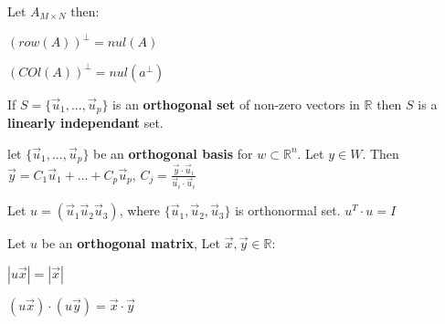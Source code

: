 \documentclass[5pt]{article}
\begin{document}
\begin{multicols}{2}
\begin{theorem}
  Let $A_{M\times N}$ then:
  \begin{itemize*}
    \item $(row(A))^\perp=nul(A)$
    \item $(COl(A))^\perp=nul(a^\perp)$
  \end{itemize*}
\end{theorem}

\begin{theorem}
  If $S=\{\vec{u}_1,...,\vec{u}_p\}$ is an \textbf{orthogonal set} of non-zero vectors in $\mathbb{R}$ then $S$ is a \textbf{linearly independant} set. 
\end{theorem}

\begin{theorem}
  let $\{\vec{u}_1,...,\vec{u}_p\}$ be an \textbf{orthogonal basis} for $w\subset \mathbb{R}^n$. 
  Let $y\in W$. Then $\vec{y}=C_1\vec{u}_1 + ... + C_p\vec{u}_p$, $C_j=\frac{\vec{y}\cdot\vec{u}_i}{\vec{u}_i\cdot\vec{u}_i}$
\end{theorem}

\begin{theorem}
  Let $u=(\vec{u}_1 \vec{u}_2 \vec{u}_3)$, where $\{\vec{u}_1, \vec{u}_2, \vec{u}_3\}$ is orthonormal set.
  $u^T\cdot u= I$
\end{theorem}

\begin{theorem}
  Let $u$ be an \textbf{orthogonal matrix}, Let $\vec{x},\vec{y}\in\mathbb{R}$:
  \begin{itemize*}
    \item $|u\vec{x}|=|\vec{x}|\:$
    \item $(u\vec{x})\cdot(u\vec{y})=\vec{x}\cdot\vec{y}$
  \end{itemize*}
\end{theorem}



\end{multicols}
\end{document}
